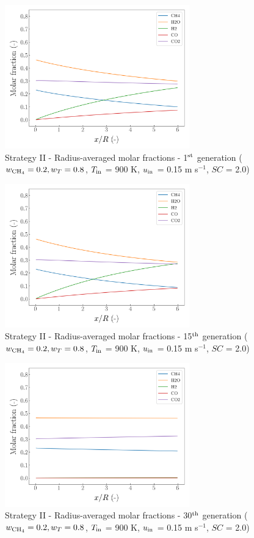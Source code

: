 \documentclass[preprint,12pt]{elsarticle}
\begin{document}
\begin{figure}[h!]
\centering
\includegraphics[width=80mm]{results/5Eq/20C_80T/GEN1-AVG.png}
\caption{\label{fig:5RES2080G1-avg} Strategy II - Radius-averaged molar fractions - 1$^{\rm{st}}$ generation ($w_{\rm{CH_4}} = 0.2, w_T = 0.8$, $T_{\rm{in}}$ = 900 K, $u_{\rm{in}}$ = 0.15 m s$^{-1}$, $SC$ = 2.0)}
\end{figure}

\begin{figure}[h!]
\centering
\includegraphics[width=80mm]{results/5Eq/20C_80T/GEN15-AVG.png}
\caption{\label{fig:5RES2080G15-avg} Strategy II - Radius-averaged molar fractions - 15$^{\rm{th}}$ generation ($w_{\rm{CH_4}} = 0.2, w_T = 0.8$, $T_{\rm{in}}$ = 900 K, $u_{\rm{in}}$ = 0.15 m s$^{-1}$, $SC$ = 2.0)}
\end{figure}

\begin{figure}[h!]
\centering
\includegraphics[width=80mm]{results/5Eq/20C_80T/GEN30-AVG.png}
\caption{\label{fig:5RES2080G30-avg} Strategy II - Radius-averaged molar fractions -  30$^{\rm{th}}$ generation ($w_{\rm{CH_4}} = 0.2, w_T = 0.8$, $T_{\rm{in}}$ = 900 K, $u_{\rm{in}}$ = 0.15 m s$^{-1}$, $SC$ = 2.0)}
\end{figure}
\end{document}
